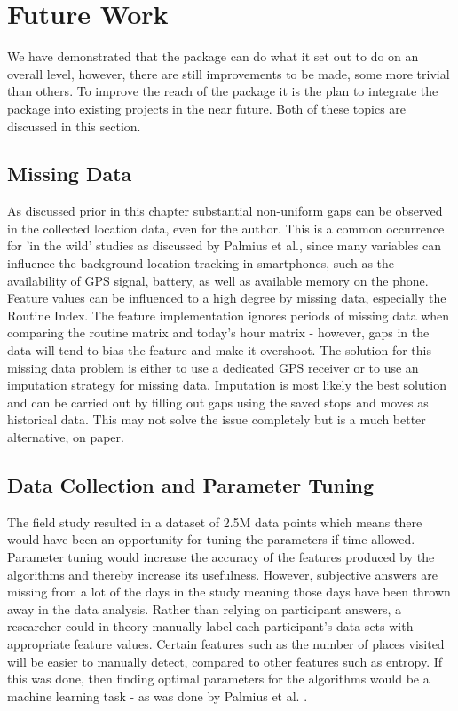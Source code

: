 \clearpage
\section{Future Work}
We have demonstrated that the package can do what it set out to do on an overall level, however, there are still improvements to be made, some more trivial than others. To improve the reach of the package it is the plan to integrate the package into existing projects in the near future. Both of these topics are discussed in this section.

\subsection{Missing Data}
As discussed prior in this chapter substantial non-uniform gaps can be observed in the collected location data, even for the author. This is a common occurrence for 'in the wild' studies as discussed by Palmius et al.\cite{palmius2017}, since many variables can influence the background location tracking in smartphones, such as the availability of GPS signal, battery, as well as available memory on the phone. \\

Feature values can be influenced to a high degree by missing data, especially the Routine Index. The feature implementation ignores periods of missing data when comparing the routine matrix and today's hour matrix - however, gaps in the data will tend to bias the feature and make it overshoot. The solution for this missing data problem is either to use a dedicated GPS receiver or to use an imputation strategy for missing data. Imputation is most likely the best solution and can be carried out by filling out gaps using the saved stops and moves as historical data. This may not solve the issue completely but is a much better alternative, on paper. 

\subsection{Data Collection and Parameter Tuning}
The field study resulted in a dataset of 2.5M data points which means there would have been an opportunity for tuning the parameters if time allowed. Parameter tuning would increase the accuracy of the features produced by the algorithms and thereby increase its usefulness. However, subjective answers are missing from a lot of the days in the study meaning those days have been thrown away in the data analysis. Rather than relying on participant answers, a researcher could in theory manually label each participant's data sets with appropriate feature values. Certain features such as the number of places visited will be easier to manually detect, compared to other features such as entropy. If this was done, then finding optimal parameters for the algorithms would be a machine learning task - as was done by Palmius et al. \cite{palmius2017}. \\

